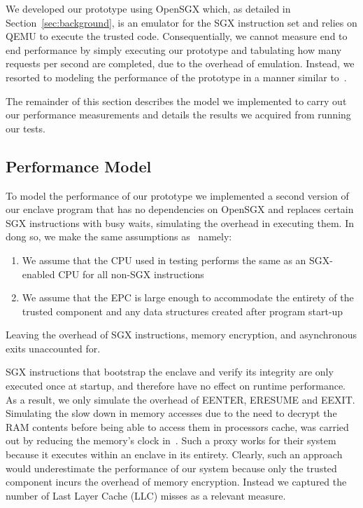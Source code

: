 \documentclass[../main.tex]{subfiles}
\begin{document}
We developed our prototype using OpenSGX which, as detailed in 
Section~\ref{sec:background}, is an emulator for the SGX instruction set and
relies on QEMU to execute the trusted code. Consequentially, we cannot measure
end to end performance by simply executing our prototype and tabulating how
many requests per second are completed, due to the overhead of emulation.
Instead, we resorted to modeling the performance of the prototype in a manner
similar to~\cite{Baumann14}.

The remainder of this section describes the model we implemented to carry out
our performance measurements and details the results we acquired from running
our tests.

\subsection{Performance Model}

To model the performance of our prototype we implemented a second version of
our enclave program that has no dependencies on OpenSGX and replaces certain
SGX instructions with busy waits, simulating the overhead in executing them.
In dong so, we make the same assumptions as~\cite{Baumann14} namely:
\begin{enumerate}
  \item We assume that the CPU used in testing performs the same as an
    SGX-enabled CPU for all non-SGX instructions
  \item We assume that the EPC is large enough to accommodate the
    entirety of the trusted component and any data structures created
    after program start-up
\end{enumerate}
Leaving the overhead of SGX instructions, memory encryption, and asynchronous
exits unaccounted for.

SGX instructions that bootstrap the enclave and verify its integrity are only
executed once at startup, and therefore have no effect on runtime performance.
As a result, we only simulate the overhead of EENTER, ERESUME and EEXIT.
Simulating the slow down in memory accesses due to the need to decrypt the RAM
contents before being able to access them in processors cache, was carried out
by reducing the memory's clock in~\cite{Baumann14}. Such a proxy works for
their system because it executes within an enclave in its entirety. Clearly,
such an approach would underestimate the performance of our system because
only the trusted component incurs the overhead of memory encryption. Instead
we captured the number of Last Layer Cache (LLC) misses as a relevant measure.
\end{document}
